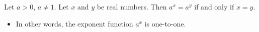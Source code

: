 \begin{frame}
\begin{proposition}
Let $a>0$, $a\neq 1$. Let $x$ and $y$ be real numbers. Then $a^{x}=a^{y}$ if and only if $x=y$.
\end{proposition}
\begin{itemize}
\item In other words, the exponent function $a^{x}$ is one-to-one.
\end{itemize}

\end{frame}